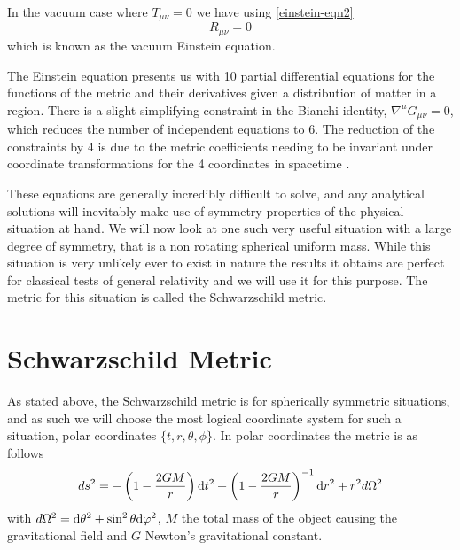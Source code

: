 In the vacuum case where \(T_{\mu \nu} = 0\) we have using \eqref{einstein-eqn2}
\begin{equation} \label{vacuum}
	R_{\mu \nu} = 0
\end{equation}
which is known as the vacuum Einstein equation.

The Einstein equation presents us with 10 partial differential equations for the functions of the metric and their derivatives given a distribution of matter in a region. There is a slight simplifying constraint in the Bianchi identity, \(\nabla^{\mu} G_{\mu \nu} = 0\), which reduces the number of independent equations to 6. The reduction of the constraints by 4 is due to the metric coefficients needing to be invariant under coordinate transformations for the 4 coordinates in spacetime \cite{carroll}. 

These equations are generally incredibly difficult to solve, and any analytical solutions will inevitably make use of symmetry properties of the physical situation at hand. We will now look at one such very useful situation with a large degree of symmetry, that is a non rotating spherical uniform mass. While this situation is very unlikely ever to exist in nature the results it obtains are perfect for classical tests of general relativity and we will use it for this purpose. The metric for this situation is called the Schwarzschild metric.

\section{Schwarzschild Metric}

As stated above, the Schwarzschild metric is for spherically symmetric situations, and as such we will choose the most logical coordinate system for such a situation, polar coordinates \( \{t, r, \theta, \phi \} \). In polar coordinates the metric is as follows \cite{carroll}
\begin{equation} \label{schwarzschild}
	ds^2 = - \left(1 - \frac{2 G M}{r}\right) \text{d} t^2 + \left(1 - \frac{2 G M}{r}\right)^{-1} \text{d} r^2 + r^2 d\Omega^2
\end{equation}
with \(d\Omega^2 = \text{d} \theta^2 + \sin^2 \theta \text{d} \varphi^2\), \(M\) the total mass of the object causing the gravitational field and \(G\) Newton's gravitational constant. 

